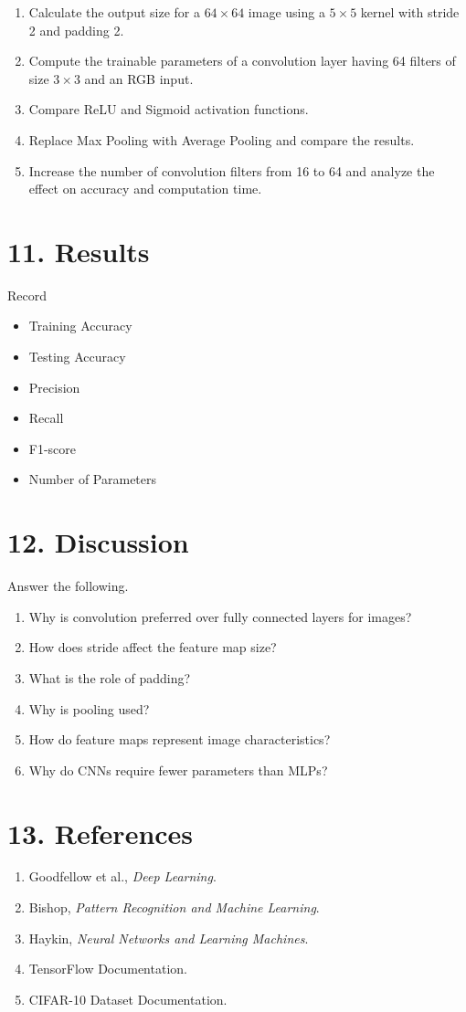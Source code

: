 \documentclass[11pt]{article}
\begin{document}
\begin{enumerate}
\item Calculate the output size for a $64\times64$ image using a $5\times5$ kernel with stride 2 and padding 2.
\item Compute the trainable parameters of a convolution layer having 64 filters of size $3\times3$ and an RGB input.
\item Compare ReLU and Sigmoid activation functions.
\item Replace Max Pooling with Average Pooling and compare the results.
\item Increase the number of convolution filters from 16 to 64 and analyze the effect on accuracy and computation time.
\end{enumerate}

\section*{11. Results}

Record

\begin{itemize}
\item Training Accuracy
\item Testing Accuracy
\item Precision
\item Recall
\item F1-score
\item Number of Parameters
\end{itemize}

\section*{12. Discussion}

Answer the following.

\begin{enumerate}
\item Why is convolution preferred over fully connected layers for images?
\item How does stride affect the feature map size?
\item What is the role of padding?
\item Why is pooling used?
\item How do feature maps represent image characteristics?
\item Why do CNNs require fewer parameters than MLPs?
\end{enumerate}

\section*{13. References}

\begin{enumerate}
\item Goodfellow et al., \emph{Deep Learning}.
\item Bishop, \emph{Pattern Recognition and Machine Learning}.
\item Haykin, \emph{Neural Networks and Learning Machines}.
\item TensorFlow Documentation.
\item CIFAR-10 Dataset Documentation.
\end{enumerate}
\end{document}
